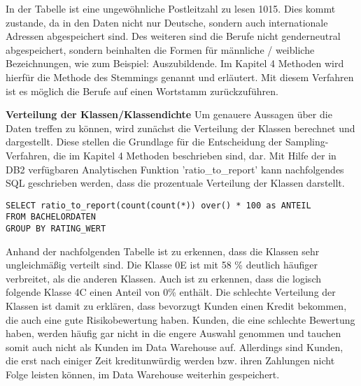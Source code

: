 In der Tabelle ist eine ungewöhnliche Postleitzahl zu lesen 1015. 
Dies kommt zustande, da in den Daten nicht nur Deutsche, sondern auch internationale Adressen abgespeichert sind. 
Des weiteren sind die Berufe nicht genderneutral abgespeichert, sondern beinhalten die Formen für männliche / weibliche Bezeichnungen, wie zum Beispiel: Auszubildende. 
Im Kapitel 4 Methoden wird hierfür die Methode des Stemmings genannt und erläutert.
Mit diesem Verfahren ist es möglich die Berufe auf einen Wortstamm zurückzuführen.


\textbf{Verteilung der Klassen/Klassendichte}
Um genauere Aussagen über die Daten treffen zu können, wird zunächst die Verteilung der Klassen berechnet und dargestellt. 
Diese stellen die Grundlage für die Entscheidung der Sampling-Verfahren, die im Kapitel 4 Methoden beschrieben sind, dar.
Mit Hilfe der in DB2 verfügbaren Analytischen Funktion 'ratio_to_report' kann nachfolgendes SQL geschrieben werden, dass die prozentuale Verteilung der Klassen darstellt. 

\begin{verbatim}
SELECT ratio_to_report(count(count(*)) over() * 100 as ANTEIL 
FROM BACHELORDATEN 
GROUP BY RATING_WERT
\end{verbatim}


Anhand der nachfolgenden Tabelle ist zu erkennen, dass die Klassen sehr ungleichmäßig verteilt sind. 
Die Klasse 0E ist mit 58 \% deutlich häufiger verbreitet, als die anderen Klassen. 
Auch ist zu erkennen, dass die logisch folgende Klasse 4C einen Anteil von 0\% enthält. 
Die schlechte Verteilung der Klassen ist damit zu erklären, dass bevorzugt Kunden einen Kredit bekommen, die auch eine gute Risikobewertung haben. 
Kunden, die eine schlechte Bewertung haben, werden häufig gar nicht in die engere Auswahl genommen und tauchen somit auch nicht als Kunden im Data Warehouse auf. 
Allerdings sind Kunden, die erst nach einiger Zeit kreditunwürdig werden bzw. ihren Zahlungen nicht Folge leisten können, im Data Warehouse weiterhin gespeichert. 

